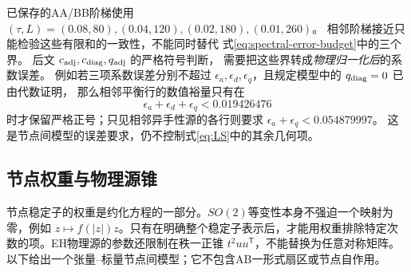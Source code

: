 \documentclass[UTF8,a4paper,11pt,fontset=fandol]{ctexart}
\numberwithin{equation}{section}
\theoremstyle{definition}
\begin{document}
已保存的AA/BB阶梯使用
$(\tau,L)=(0.08,80),(0.04,120),(0.02,180),(0.01,260)$。
相邻阶梯接近只能检验这些有限和的一致性，不能同时替代
式\eqref{eq:spectral-error-budget}中的三个界。
后文 $c_{\rm adj},c_{\rm diag},q_{\rm adj}$ 的严格符号判断，
需要把这些界转成\emph{物理归一化后}的系数误差。
例如若三项系数误差分别不超过
$\epsilon_a,\epsilon_d,\epsilon_q$，且规定模型中的 $q_{\rm diag}=0$ 已由代数证明，
那么相邻平衡行的数值裕量只有在
\[
\epsilon_a+\epsilon_d+\epsilon_q<0.019426476
\]
时才保留严格正号；只见相邻异手性源的各行则要求
$\epsilon_a+\epsilon_q<0.054879997$。
这是节点间模型的误差要求，仍不控制式\eqref{eq:LS}中的其余几何项。

\subsection{节点权重与物理源锥}
节点稳定子的权重是约化方程的一部分。$SO(2)$等变性本身不强迫一个映射为零，例如 $z\mapsto f(|z|)z$。只有在明确整个稳定子表示后，才能用权重排除特定次数的项。EH物理源的参数还限制在秩一正锥 $t^2uu^{\mathsf T}$，不能替换为任意对称矩阵。以下给出一个张量--标量节点间模型；它不包含AB一形式扇区或节点自作用。
\end{document}
